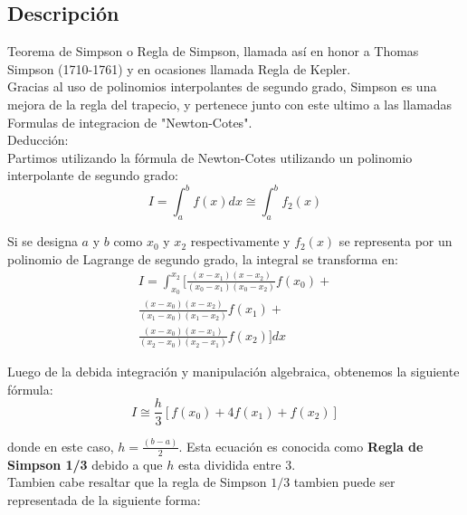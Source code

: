 \documentclass[journal,transmag]{IEEEtran}
\theoremstyle{mytheoremstyle}
\theoremstyle{mytheoremstyle}
\theoremstyle{myproblemstyle}
\begin{document}
    \subsection{Descripción}
        Teorema de Simpson o Regla de Simpson, llamada así en honor a Thomas Simpson (1710-1761) y en ocasiones llamada Regla de Kepler.
        \\

        Gracias al uso de polinomios interpolantes de segundo grado, Simpson es una mejora de la regla del trapecio, y
        pertenece junto con este ultimo a las llamadas Formulas de integracion de "Newton-Cotes".\\

        Deducción: \cite{chapra_metodos_2007} \\
        Partimos utilizando la fórmula de Newton-Cotes utilizando un polinomio interpolante de segundo grado:
        \begin{equation} 
            I = \int_a^b f(x) dx  \cong  \int_a^b f_2(x)
        \end{equation}

        Si se designa $a$ y $b$ como $x_0$ y $x_2$ respectivamente y $f_2(x)$ se representa por un polinomio de Lagrange de segundo grado,
        la integral se transforma en:
        \begin{equation} 
            \begin{split}
                I = \int_{x_0}^{x_2} [\frac{(x-x_1)(x-x_2)}{(x_0-x_1)(x_0-x_2)} f(x_0) + \\
                \frac{(x-x_0)(x-x_2)}{(x_1-x_0)(x_1-x_2)} f(x_1) + \\
                \frac{(x-x_0)(x-x_1)}{(x_2-x_0)(x_2-x_1)} f(x_2)] dx
            \end{split}
        \end{equation} 

        Luego de la debida integración y manipulación algebraica, obtenemos la siguiente fórmula:
        \begin{equation}
            I \cong \frac{h}{3}[f(x_0) + 4f(x_1) + f(x_2)]
        \end{equation}

        donde en este caso, $h = \frac{(b-a)}{2}$. Esta ecuación es conocida como \textbf{Regla de Simpson 1/3} 
        debido a que $h$ esta dividida entre $3$. \\

        Tambien cabe resaltar que la regla de Simpson $1/3$ tambien puede ser representada de la siguiente forma:
\end{document}
